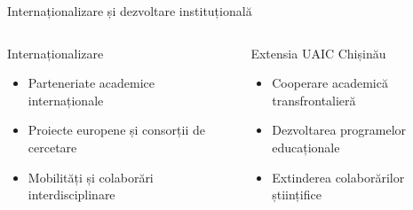 \documentclass[11pt,aspectratio=169]{beamer}
\begin{document}
\begin{frame}{Internaționalizare și dezvoltare instituțională}
\vspace{0.4em}
\begin{columns}[T,onlytextwidth]
\begin{block}{\faGlobeEurope\; Internaționalizare}
\footnotesize
\begin{itemize}\setlength\itemsep{0.45em}
  \item Parteneriate academice internaționale
  \item Proiecte europene și consorții de cercetare
  \item Mobilități și colaborări interdisciplinare
\end{itemize}
\end{block}
\begin{exampleblock}{\faMapMarker\; Extensia UAIC Chișinău \;\faFlag}
\footnotesize
\begin{itemize}\setlength\itemsep{0.45em}
  \item Cooperare academică transfrontalieră
  \item Dezvoltarea programelor educaționale
  \item Extinderea colaborărilor științifice
\end{itemize}
\end{exampleblock}
\end{columns}
\vspace{0.5em}
\begin{center}
\end{center}
\end{frame}
\end{document}
